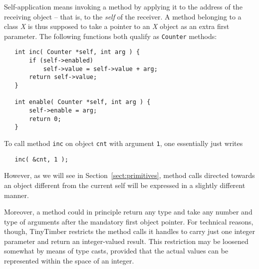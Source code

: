 \documentclass[12pt]{article}
\begin{document}
Self-application means invoking a method by applying it to the address of the receiving object -- that is, to the {\em self} of the receiver.  A method belonging to a class {\em X} is thus supposed to take a pointer to an {\em X} object as an extra first parameter.  The following functions both qualify as {\tt Counter} methods:
\begin{verbatim}
   int inc( Counter *self, int arg ) {
       if (self->enabled)
           self->value = self->value + arg;
       return self->value;
   }
   
   int enable( Counter *self, int arg ) {
       self->enable = arg;
       return 0;
   }
\end{verbatim}
To call method {\tt inc} on object {\tt cnt} with argument {\tt 1}, one essentially just writes
\begin{verbatim}
   inc( &cnt, 1 );
\end{verbatim}
However, as we will see in Section~\ref{sect:primitives}, method calls directed towards an object different from the current self will be expressed in a slightly different manner.

Moreover, a method could in principle return any type and take any number and type of arguments after the mandatory first object pointer.  For technical reasons, though, TinyTimber restricts the method calls it handles to carry just one integer parameter and return an integer-valued result.  This restriction may be loosened somewhat by means of type casts, provided that the actual values can be represented within the space of an integer.
\end{document}

